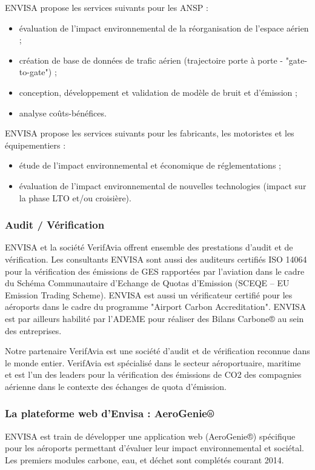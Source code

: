 \documentclass[a4paper,12pt,twoside]{article}
\begin{document}
    ENVISA propose les services suivants pour les \gls{ANSP} :
    \begin{itemize}
    	\item évaluation de l'impact environnemental de la réorganisation de l'espace aérien ;
    	\item création de base de données de trafic aérien (trajectoire porte à porte - "gate-to-gate") ;
    	\item conception, développement et validation de modèle de bruit et d'émission ;
    	\item analyse coûts-bénéfices.
    \end{itemize}
    
    ENVISA propose les services suivants pour les fabricants, les motoristes et les équipementiers :
    \begin{itemize}
    	\item étude de l'impact environnemental et économique de réglementations ;
    	\item évaluation de l'impact environnemental de nouvelles technologies (impact sur la phase LTO et/ou croisière).
    \end{itemize}
    
    \subsubsection*{Audit / Vérification}
    ENVISA et la société VerifAvia offrent ensemble des prestations d'audit et de vérification. Les consultants ENVISA sont aussi des auditeurs certifiés ISO 14064 pour la vérification des émissions de GES rapportées par l’aviation dans le cadre du Schéma Communautaire d’Echange de Quotas d’Emission (SCEQE -- EU Emission Trading Scheme). ENVISA est aussi un vérificateur certifié pour les aéroports dans le cadre du programme "Airport Carbon Accreditation". ENVISA est par ailleurs habilité par l’ADEME pour réaliser des Bilans Carbone® au sein des entreprises.
    
    Notre partenaire VerifAvia est une société d'audit et de vérification reconnue dans le monde entier. VerifAvia est spécialisé dans le secteur aéroportuaire, maritime et est l'un des leaders pour la vérification des émissions de CO2 des compagnies aérienne dans le contexte des échanges de quota d’émission.
    
    \subsubsection*{La plateforme web d'Envisa : AeroGenie®}
    ENVISA est train de développer une application web (AeroGenie®) spécifique pour les aéroports permettant d'évaluer leur impact environnemental et sociétal. Les premiers modules carbone, eau, et déchet sont complétés courant 2014.
    
\end{document}
